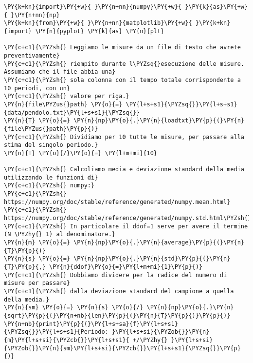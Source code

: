 \begin{Verbatim}[label=\makebox{\href{https://github.com/unipi-physics-labs/lab1-sheets/tree/main/snippy/dad_errore_statistico.py}{https://github.com/.../dad\_errore\_statistico.py}},commandchars=\\\{\}]
\PY{k+kn}{import}\PY{+w}{ }\PY{n+nn}{numpy}\PY{+w}{ }\PY{k}{as}\PY{+w}{ }\PY{n+nn}{np}
\PY{k+kn}{from}\PY{+w}{ }\PY{n+nn}{matplotlib}\PY{+w}{ }\PY{k+kn}{import} \PY{n}{pyplot} \PY{k}{as} \PY{n}{plt}

\PY{c+c1}{\PYZsh{} Leggiamo le misure da un file di testo che avrete preventivamente}
\PY{c+c1}{\PYZsh{} riempito durante l\PYZsq{}esecuzione delle misure. Assumiamo che il file abbia una}
\PY{c+c1}{\PYZsh{} sola colonna con il tempo totale corrispondente a 10 periodi, con un}
\PY{c+c1}{\PYZsh{} valore per riga.}
\PY{n}{file\PYZus{}path} \PY{o}{=} \PY{l+s+s1}{\PYZsq{}}\PY{l+s+s1}{data/pendolo.txt}\PY{l+s+s1}{\PYZsq{}}
\PY{n}{T} \PY{o}{=} \PY{n}{np}\PY{o}{.}\PY{n}{loadtxt}\PY{p}{(}\PY{n}{file\PYZus{}path}\PY{p}{)}
\PY{c+c1}{\PYZsh{} Dividiamo per 10 tutte le misure, per passare alla stima del singolo periodo.}
\PY{n}{T} \PY{o}{/}\PY{o}{=} \PY{l+m+mi}{10}

\PY{c+c1}{\PYZsh{} Calcoliamo media e deviazione standard della media utilizzando le funzioni di}
\PY{c+c1}{\PYZsh{} numpy:}
\PY{c+c1}{\PYZsh{} https://numpy.org/doc/stable/reference/generated/numpy.mean.html}
\PY{c+c1}{\PYZsh{} https://numpy.org/doc/stable/reference/generated/numpy.std.html\PYZsh{}numpy.std}
\PY{c+c1}{\PYZsh{} In particolare il ddof=1 serve per avere il termine (N \PYZhy{} 1) al denominatore.}
\PY{n}{m} \PY{o}{=} \PY{n}{np}\PY{o}{.}\PY{n}{average}\PY{p}{(}\PY{n}{T}\PY{p}{)}
\PY{n}{s} \PY{o}{=} \PY{n}{np}\PY{o}{.}\PY{n}{std}\PY{p}{(}\PY{n}{T}\PY{p}{,} \PY{n}{ddof}\PY{o}{=}\PY{l+m+mi}{1}\PY{p}{)}
\PY{c+c1}{\PYZsh{} Dobbiamo dividere per la radice del numero di misure per passare}
\PY{c+c1}{\PYZsh{} dalla deviazione standard del campione a quella della media.}
\PY{n}{sm} \PY{o}{=} \PY{n}{s} \PY{o}{/} \PY{n}{np}\PY{o}{.}\PY{n}{sqrt}\PY{p}{(}\PY{n+nb}{len}\PY{p}{(}\PY{n}{T}\PY{p}{)}\PY{p}{)}
\PY{n+nb}{print}\PY{p}{(}\PY{l+s+sa}{f}\PY{l+s+s1}{\PYZsq{}}\PY{l+s+s1}{Periodo: }\PY{l+s+si}{\PYZob{}}\PY{n}{m}\PY{l+s+si}{\PYZcb{}}\PY{l+s+s1}{ +/\PYZhy{} }\PY{l+s+si}{\PYZob{}}\PY{n}{sm}\PY{l+s+si}{\PYZcb{}}\PY{l+s+s1}{\PYZsq{}}\PY{p}{)}


\end{Verbatim}
